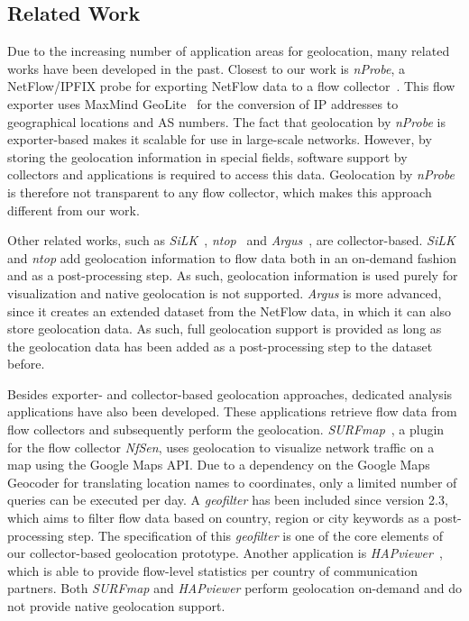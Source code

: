 \subsection{Related Work} \label{subsec:geo-related_work}

Due to the increasing number of application areas for geolocation, many related works have been developed in the past. Closest to our work is \textit{nProbe}, a NetFlow/IPFIX probe for exporting NetFlow data to a flow collector~\cite{--nProbe}. This flow exporter uses MaxMind GeoLite~\cite{MaxMind--GeoLite} for the conversion of IP addresses to geographical locations and AS numbers. The fact that geolocation by \textit{nProbe} is exporter-based makes it scalable for use in large-scale networks. However, by storing the geolocation information in special fields, software support by collectors and applications is required to access this data. Geolocation by \textit{nProbe} is therefore not transparent to any flow collector, which makes this approach different from our work.

Other related works, such as \textit{SiLK}~\cite{CERTNSAT--SiLK}, \textit{ntop}~\cite{--ntop} and \textit{Argus}~\cite{QoSient--ARGUS}, are collector-based. \textit{SiLK} and \textit{ntop} add geolocation information to flow data both in an on-demand fashion and as a post-processing step. As such, geolocation information is used purely for visualization and native geolocation is not supported. \textit{Argus} is more advanced, since it creates an extended dataset from the NetFlow data, in which it can also store geolocation data. As such, full geolocation support is provided as long as the geolocation data has been added as a post-processing step to the dataset before.

Besides exporter- and collector-based geolocation approaches, dedicated analysis applications have also been developed. These applications retrieve flow data from flow collectors and subsequently perform the geolocation. \textit{SURFmap}~\cite{Hofstede--SURFmap, Hofstede-2009-SURFmap}, a plugin for the flow collector \textit{NfSen}, uses geolocation to visualize network traffic on a map using the Google Maps API. Due to a dependency on the Google Maps Geocoder for translating location names to coordinates, only a limited number of queries can be executed per day. A \textit{geofilter} has been included since version 2.3, which aims to filter flow data based on country, region or city keywords as a post-processing step. The specification of this \textit{geofilter} is one of the core elements of our collector-based geolocation prototype. Another application is \textit{HAPviewer}~\cite{Blatter-2011-Extending}, which is able to provide flow-level statistics per country of communication partners. Both \textit{SURFmap} and \textit{HAPviewer} perform geolocation on-demand and do not provide native geolocation support.

